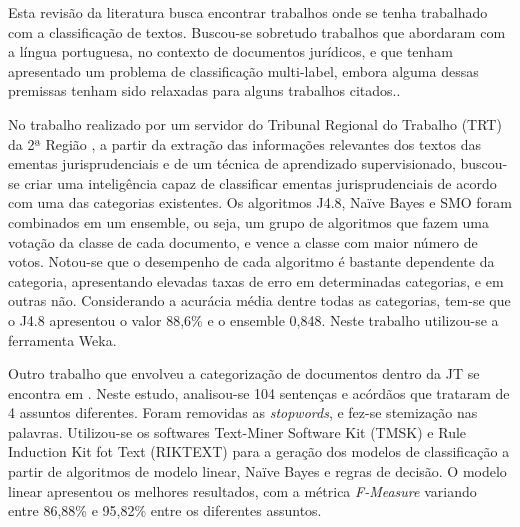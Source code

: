 \newcommand{\texCommand}[1]{\texttt{\textbackslash{#1}}}%

\newcommand{\exemplo}[1]{%
\vspace{\baselineskip}%
\noindent\fbox{\begin{minipage}{\textwidth}#1\end{minipage}}%
\\\vspace{\baselineskip}}%

\newcommand{\exemploVerbatim}[1]{%
\vspace{\baselineskip}%
\noindent\fbox{\begin{minipage}{\textwidth}%
#1\end{minipage}}%
\\\vspace{\baselineskip}}%

Esta revisão da literatura busca encontrar trabalhos onde se tenha trabalhado com a classificação de textos. Buscou-se sobretudo trabalhos que abordaram com a língua portuguesa, no contexto de documentos jurídicos, e que tenham apresentado um problema de classificação multi-label, embora alguma dessas premissas tenham sido relaxadas para alguns trabalhos citados..

No trabalho realizado por um servidor do Tribunal Regional do Trabalho (TRT) da 2ª Região \cite{ferauche}, a partir da extração das informações relevantes dos textos das ementas jurisprudenciais e de um técnica de aprendizado supervisionado,  buscou-se criar uma inteligência capaz de classificar ementas jurisprudenciais de acordo com uma das categorias existentes. Os algoritmos J4.8, Naïve Bayes e SMO foram combinados em um ensemble, ou seja, um grupo de algoritmos que fazem uma votação da classe de cada documento, e vence a classe com maior número de votos. Notou-se que o desempenho de cada algoritmo é bastante dependente da categoria, apresentando elevadas taxas de erro em determinadas categorias, e em outras não. Considerando a acurácia média dentre todas as categorias, tem-se que o J4.8 apresentou o valor 88,6\% e o ensemble 0,848. Neste trabalho utilizou-se a ferramenta Weka.

Outro trabalho que envolveu a categorização de documentos dentro da JT se encontra em \cite{ticom_aplicacao_2007}. Neste estudo, analisou-se 104 sentenças e acórdãos que trataram de 4 assuntos diferentes. Foram removidas as \textit{stopwords}, e fez-se stemização nas palavras. Utilizou-se os softwares Text-Miner Software Kit (TMSK) e Rule Induction Kit fot Text (RIKTEXT) para a geração dos modelos de classificação a partir de algoritmos de modelo linear, Naïve Bayes e regras de decisão. O modelo linear apresentou os melhores resultados, com a métrica \textit{F-Measure} variando  entre 86,88\% e 95,82\% entre os diferentes assuntos.


